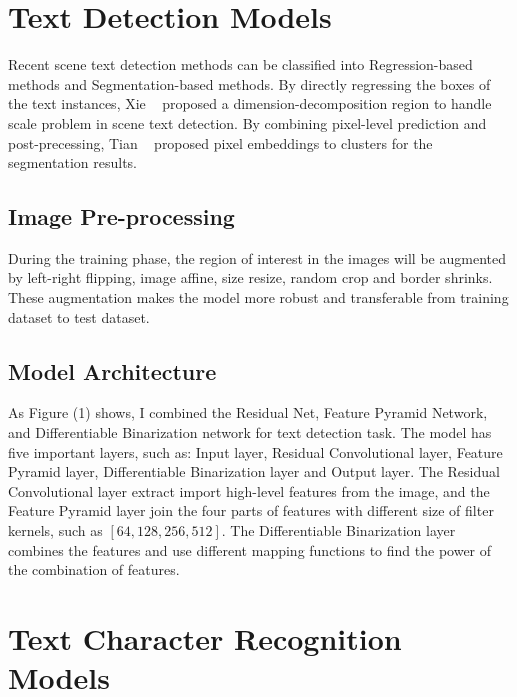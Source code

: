 \documentclass[review]{cvpr}
\begin{document}

\section{Text Detection Models}



  Recent scene text detection methods can be classified into Regression-based methods and Segmentation-based methods.
  By directly regressing the boxes of the text instances, Xie \etal~\cite{xie2019scene} proposed a dimension-decomposition region to handle scale problem in scene text detection.
  By combining pixel-level prediction and post-precessing, Tian \etal~\cite{tian2019learning} proposed pixel embeddings to clusters for the segmentation results.

\subsection{Image Pre-processing}

  During the training phase, the region of interest in the images will be augmented by left-right flipping, image affine, size resize, random crop and border shrinks.
  These augmentation makes the model more robust and transferable from training dataset to test dataset.

\subsection{Model Architecture}

  As Figure (1) shows, I combined the Residual Net, Feature Pyramid Network, and Differentiable Binarization network for text detection task.
  The model has five important layers, such as: Input layer, Residual Convolutional layer, Feature Pyramid layer, Differentiable Binarization layer and Output layer.
  The Residual Convolutional layer extract import high-level features from the image,
  and the Feature Pyramid layer join the four parts of features with different size of filter kernels, such as $[64,128,256,512]$.
  The Differentiable Binarization layer combines the features and use different mapping functions to find the power of the combination of features.

\section{Text Character Recognition Models}
\end{document}
